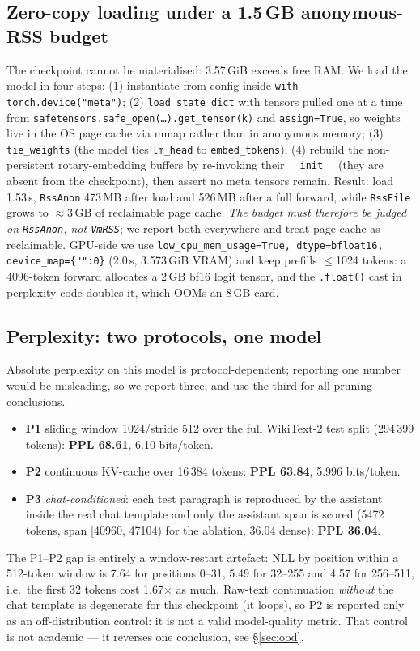 \documentclass[11pt]{article}
\newcommand{\code}[1]{\texttt{\small #1}}
\begin{document}
\subsection{Zero-copy loading under a 1.5\,GB anonymous-RSS budget}
The checkpoint cannot be materialised: 3.57\,GiB exceeds free RAM. We load the model in
four steps: (1) instantiate from config inside \code{with torch.device("meta")};
(2) \code{load\_state\_dict} with tensors pulled one at a time from
\code{safetensors.safe\_open(\ldots).get\_tensor(k)} and \code{assign=True}, so weights
live in the OS page cache via mmap rather than in anonymous memory; (3) \code{tie\_weights}
(the model ties \code{lm\_head} to \code{embed\_tokens}); (4) rebuild the non-persistent
rotary-embedding buffers by re-invoking their \code{\_\_init\_\_} (they are absent from the
checkpoint), then assert no meta tensors remain. Result: load 1.53\,s, \code{RssAnon}
473\,MB after load and 526\,MB after a full forward, while \code{RssFile} grows to
$\approx$3\,GB of reclaimable page cache. \emph{The budget must therefore be judged on
\code{RssAnon}, not \code{VmRSS}}; we report both everywhere and treat page cache as
reclaimable. GPU-side we use \code{low\_cpu\_mem\_usage=True, dtype=bfloat16,
device\_map=\{"":0\}} (2.0\,s, 3.573\,GiB VRAM) and keep prefills $\le$1024 tokens: a
4096-token forward allocates a 2\,GB bf16 logit tensor, and the \code{.float()} cast in
perplexity code doubles it, which OOMs an 8\,GB card.

\subsection{Perplexity: two protocols, one model}
Absolute perplexity on this model is protocol-dependent; reporting one number would be
misleading, so we report three, and use the third for all pruning conclusions.
\begin{itemize}
\item \textbf{P1} sliding window 1024/stride 512 over the full WikiText-2 test split
(294\,399 tokens): \textbf{PPL 68.61}, 6.10 bits/token.
\item \textbf{P2} continuous KV-cache over 16\,384 tokens: \textbf{PPL 63.84},
5.996 bits/token.
\item \textbf{P3} \emph{chat-conditioned}: each test paragraph is reproduced by the
assistant inside the real chat template and only the assistant span is scored (5472
tokens, span [40960, 47104) for the ablation, 36.04 dense): \textbf{PPL 36.04}.
\end{itemize}
The P1--P2 gap is entirely a window-restart artefact: NLL by position within a 512-token
window is 7.64 for positions 0--31, 5.49 for 32--255 and 4.57 for 256--511, i.e.\ the
first 32 tokens cost 1.67$\times$ as much. Raw-text continuation \emph{without} the chat
template is degenerate for this checkpoint (it loops), so P2 is reported only as an
off-distribution control: it is not a valid model-quality metric. That control is not
academic --- it reverses one conclusion, see \S\ref{sec:ood}.
\end{document}

